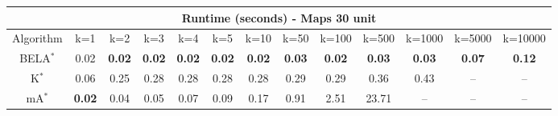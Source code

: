 \begin{tabular}{c|cccccccccccc}\toprule
\multicolumn{13}{c}{Runtime (seconds) - Maps 30 unit}\\ \midrule
Algorithm & k=1 & k=2 & k=3 & k=4 & k=5 & k=10 & k=50 & k=100 & k=500 & k=1000 & k=5000 & k=10000 \\ \midrule
BELA$^*$ & 0.02 & \textbf{0.02} & \textbf{0.02} & \textbf{0.02} & \textbf{0.02} & \textbf{0.02} & \textbf{0.03} & \textbf{0.02} & \textbf{0.03} & \textbf{0.03} & \textbf{0.07} & \textbf{0.12} \\
K$^*$ & 0.06 & 0.25 & 0.28 & 0.28 & 0.28 & 0.28 & 0.29 & 0.29 & 0.36 & 0.43 & -- & -- \\
mA$^*$ & \textbf{0.02} & 0.04 & 0.05 & 0.07 & 0.09 & 0.17 & 0.91 & 2.51 & 23.71 & -- & -- & -- \\ \bottomrule 
\end{tabular}
